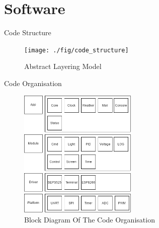\documentclass[apectratio=169]{beamer}
\begin{document}
  \section{Software}
  	\begin{frame}{Code Structure}
		 \begin{figure}
                        \centering
                        \texttt{[image: ./fig/code\_structure]}
                        \caption{Abstract Layering Model}
                \end{figure}
  	\end{frame}
	\begin{frame}{Code Organisation}
		 \begin{figure}
                        \centering
                        \includegraphics[width=0.5\textwidth]{./fig/block_code}
                        \caption{Block Diagram Of The Code Organisation}
                \end{figure}
  	\end{frame}
\end{document}
